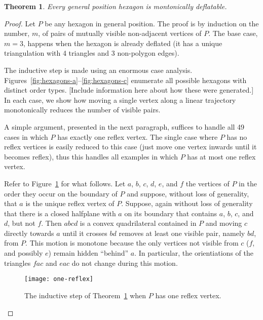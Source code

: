 \documentclass{article}
\newtheorem{theorem}{Theorem}
\begin{document}
\begin{theorem}\label{thm:hex-deflate}
Every general position hexagon is montonically deflatable.
\end{theorem}


\begin{proof}
Let $P$ be any hexagon in general position.  The proof is by induction on
the number, $m$, of pairs of mutually visible non-adjacent vertices of
$P$.  The base case, $m=3$, happens when the hexagon is already deflated
(it has a unique triangulation with 4 triangles and 3 non-polygon edges).

The inductive step is made using an enormous case analysis.
Figures~\ref{fig:hexagons-a}--\ref{fig:hexagons-c} enumerate all possible
hexagons with distinct order types.  [Include information here about
how these were generated.]  In each case, we show how moving a single
vertex along a linear trajectory monotonically reduces the number of
visible pairs.

A simple argument, presented in the next paragraph, suffices to handle
all 49 cases in which $P$ has exactly one reflex vertex.  The single
case where $P$ has no reflex vertices is easily reduced to this case
(just move one vertex inwards until it becomes reflex), thus this handles
all examples in which $P$ has at most one reflex vertex.

Refer to Figure~\ref{fig:one-reflex} for what follows.  Let $a$, $b$,
$c$, $d$, $e$, and $f$ the vertices of $P$ in the order they occur on
the boundary of $P$ and suppose, without loss of generality, that $a$
is the unique reflex vertex of $P$.  Suppose, again without loss of
generality that there is a closed halfplane with $a$ on its boundary that
contains $a$, $b$, $c$, and $d$, but not $f$. Then $abcd$ is a convex
quadrilateral contained in $P$ and moving $c$ directly towards $a$ until
it crosses $bd$ removes at least one visible pair, namely $bd$, from $P$.
This motion is monotone because the only vertices not visible from $c$
($f$, and possibly $e$) remain hidden ``behind'' $a$.  In particular,
the orientiations of the triangles $fac$ and $eac$ do not change during
this motion.

\begin{figure}
  \begin{center}
    \texttt{[image: one-reflex]}
  \end{center}
  \caption{The inductive step of Theorem~\ref{thm:hex-deflate} when $P$ has
    one reflex vertex.}
  \label{fig:one-reflex}
\end{figure}


\end{proof}
\end{document}
